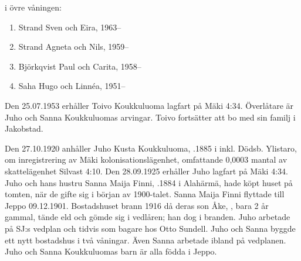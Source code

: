  i övre våningen:
\begin{enumerate}
  \item Strand Sven och Eira,	1963--
  \item Strand Agneta och Nils, 1959--
  \item Björkqvist Paul och Carita, 1958--
  \item Saha Hugo och Linnéa,	1951--
\end{enumerate}


Den 25.07.1953 erhåller Toivo Koukkuluoma lagfart på Mäki 4:34.	Överlåtare är Juho och Sanna Koukkuluomas arvingar. Toivo fortsätter att bo med sin familj i Jakobstad.


Den 27.10.1920 anhåller Juho Kusta Koukkuluoma, .1885 i inkl. Dödsb. Ylistaro, om inregistrering av Mäki kolonisationslägenhet, omfattande 0,0003 mantal av skattelägenhet Silvast 4:10. Den 28.09.1925 erhåller Juho lagfart på Mäki 4:34. Juho och hans hustru Sanna Maija Finni, .1884 i Alahärmä, hade köpt huset på tomten, när de gifte sig i början av 1900-talet. Sanna Maija Finni flyttade till Jeppo 09.12.1901.	Bostadshuset brann 1916 då deras son Åke, , bara 2 år gammal, tände eld och 	gömde sig i vedlåren; han dog i branden. Juho arbetade på SJ:s vedplan och tidvis som bagare hos Otto Sundell. Juho och Sanna byggde	ett nytt bostadshus i två våningar. Även Sanna arbetade ibland på 	vedplanen. Juho och Sanna Koukkuluomas barn är alla födda i Jeppo.
\begin{jhchildren}
  \item {}
  \item {}
  \item {}
  \item {}
  \item {}
  \item {}
  \item {}
  \item {}
  \item {}
  \item {}
\end{jhchildren}

